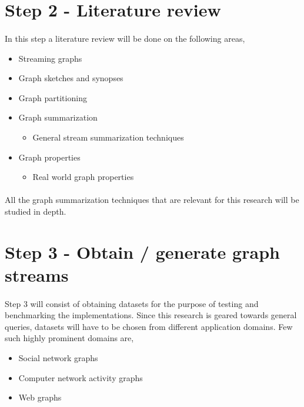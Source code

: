 \section*{Step 2 - Literature review}

\paragraph{}
In this step a literature review will be done on the following areas,

\begin{itemize}
    \item Streaming graphs
    \item Graph sketches and synopses
    \item Graph partitioning
    \item Graph summarization
        \begin{itemize}
            \item General stream summarization techniques
        \end{itemize}
    \item Graph properties
        \begin{itemize}
            \item Real world graph properties
        \end{itemize}
\end{itemize}

\paragraph{}
All the graph summarization techniques that are relevant for this research will be studied in depth. 

\section*{Step 3 - Obtain / generate graph streams}

\paragraph{}
Step 3 will consist of obtaining datasets for the purpose of testing and benchmarking the implementations. Since this research is geared towards general queries, datasets will have to be chosen from different application domains. Few such highly prominent domains are, 

\begin{itemize}
    \item Social network graphs
    \item Computer network activity graphs
    \item Web graphs
\end{itemize}

